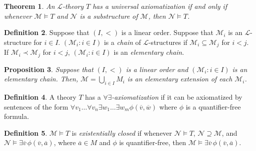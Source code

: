 \documentclass{amsart}
\newtheorem{theorem}{Theorem}[subsection]
\newtheorem{proposition}[theorem]{Proposition}
\theoremstyle{definition}
\newtheorem{definition}[theorem]{Definition}
\numberwithin{equation}{section}
\begin{document}
\begin{theorem}
	An $\mathcal{L}$-theory $T$ has a universal axiomatization if and only if
	whenever $\mathcal{M} \models T$ and $\mathcal{N}$ is a substructure of $\mathcal{M}$,
	then $\mathcal{N} \models T$.
\end{theorem}

\begin{definition}
	Suppose that $(I,<)$ is a linear order.
	Suppose that $\mathcal{M}_i$ is an $\mathcal{L}$-structure for $i \in I$.
	$(\mathcal{M}_i: i \in I)$ is a \emph{chain} of $\mathcal{L}$-structures if $\mathcal{M}_i \subseteq \mathcal{M}_j$ for $i < j$.
	If $\mathcal{M}_i \prec \mathcal{M}_j$ for $i < j$,
	$(\mathcal{M}_i: i \in I)$ is an \emph{elementary chain}.
\end{definition}

\begin{proposition}
	Suppose that $(I,<)$ is a linear order and
	$(\mathcal{M}_i: i \in I)$ is an elementary chain.
	Then, $\mathcal{M} = \bigcup_{i\in I} M_i$ is an elementary extension of each $\mathcal{M}_i$.
\end{proposition}

\begin{definition}
	A theory $T$ has a \emph{$\forall\exists$-axiomatization} if it can be axiomatized by sentences of
	the form $\forall v_1\dots\forall v_n \exists w_1\dots \exists w_m \phi(\overline{v},\overline{w})$
	where $\phi$ is a quantifier-free formula.
\end{definition}

\begin{definition}
	$\mathcal{M} \models T$ is \emph{existentially closed}
	if whenever $\mathcal{N} \models T$, $\mathcal{N} \supseteq \mathcal{M}$,
	and $\mathcal{N} \models \exists \overline{v}\, \phi(\overline{v},\overline{a})$,
	where $\overline{a} \in M$ and $\phi$ is quantifier-free,
	then $\mathcal{M} \models \exists \overline{v} \, \phi(\overline{v},\overline{a})$.
\end{definition}
\end{document}

